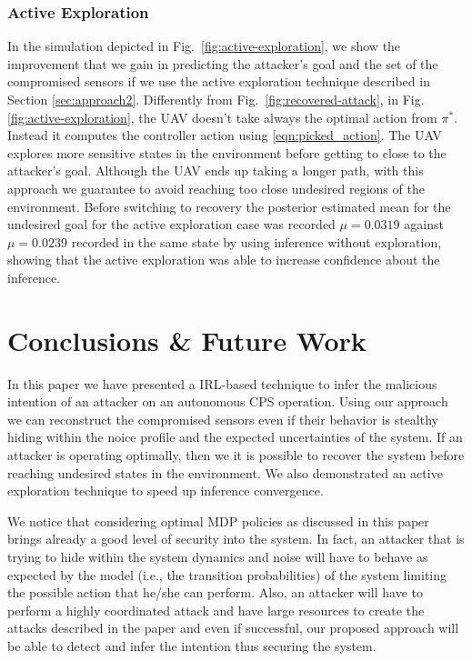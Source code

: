 \documentclass[letterpaper, 10 pt, conference]{ieeeconf}  %
\begin{document}
\subsubsection{Active Exploration}
In the simulation depicted in Fig.~\ref{fig:active-exploration}, we show the improvement that we gain in predicting the attacker's goal and the set of the compromised sensors if we use the active exploration technique described in Section \ref{sec:approach2}. Differently from Fig.~\ref{fig:recovered-attack}, in Fig. \ref{fig:active-exploration}, the UAV doesn't take always the optimal action from $\pi^*$. Instead it computes the controller action using \eqref{eqn:picked_action}. The UAV explores more sensitive states in the environment before getting to close to the attacker's goal. Although the UAV ends up taking a longer path, with this approach we guarantee to avoid reaching too close undesired regions of the environment. Before switching to recovery the posterior estimated mean for the undesired goal for the active exploration case was recorded $\mu=0.0319$ against $\mu=0.0239$ recorded in the same state by using inference without exploration, showing that the active exploration was able to increase confidence about the inference.

\section{Conclusions \& Future Work}\label{sec:conclusion}
In this paper we have presented a IRL-based technique to infer the malicious intention of an attacker on an autonomous CPS operation. Using our approach we can reconstruct the compromised sensors even if their behavior is stealthy hiding within the noice profile and the expected uncertainties of the system. If an attacker is operating optimally, then we it is possible to recover the system before reaching undesired states in the environment. We also demonstrated an active exploration technique to speed up inference convergence.

We notice that considering optimal MDP policies as discussed in this paper brings already a good level of security into the system. In fact, an attacker that is trying to hide within the system dynamics and noise will have to behave as expected by the model (i.e., the transition probabilities) of the system limiting the possible action that he/she can perform. Also, an attacker will have to perform a highly coordinated attack and have large resources to create the attacks described in the paper and even if successful, our proposed approach will be able to detect and infer the intention thus securing the system.
\end{document}
